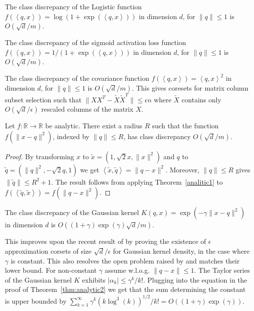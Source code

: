 \documentclass[anon,12pt]{colt2019} %
\newcommand{\ip}[1]{\left \langle #1 \right \rangle}
\newcommand{\R}{\mathbb{R}}
\newcommand{\eps}{\epsilon}
\begin{document}
{\begin{corollary}\label{cdlogistic}
The class discrepancy of the Logistic function $f(\ip{q,x}) = \log(1+\exp(\ip{q,x}))$ in dimension $d$, for $\|q\| \leq 1$ is $O(\sqrt{d}/m)$.
\end{corollary}
\begin{corollary}\label{cdsigmoid}
The class discrepancy of the sigmoid activation loss function $f(\ip{q,x}) = 1/(1+\exp(\ip{q,x}))$ in dimension $d$, for $\|q\| \leq 1$ is $O(\sqrt{d}/m)$.
\end{corollary}


\begin{corollary}
The class discrepancy of the covariance function $f(\ip{q,x}) = \ip{q,x}^2$ in dimension $d$, for $\|q\| \leq 1$ is $O(\sqrt{d}/m)$. This gives coresets for matrix column subset selection such that $\|XX^T - \tilde X \tilde X^T\| \le \eps n$ where $\tilde X$ contains only $O(\sqrt{d}/\eps)$ rescaled columns of the matrix $X$.
\end{corollary}



\begin{theorem} \label{thm:analytic2}
Let $f:\R\rightarrow\R$ be analytic. There exist a radius $R$ such that the function $f(\|x-q\|^2)$, indexed by $\|q\| \leq R$, has class discrepancy $O(\sqrt{d}/m)$. 
\end{theorem}
\begin{proof}
By transforming $x$ to $\tilde{x} = (1, \sqrt{2}x, \|x\|^2)$ and $q$ to $\tilde{q} = (\|q\|^2, -\sqrt{2}q, 1)$ we get $\ip{\tilde{x},\tilde{q}} = \|q-x\|^2$. Moreover, $\|q\| \le R$ gives $\|\tilde q\| \le R^2+1$. The result follows from applying Theorem~\ref{analitic1} to $f(\ip{ \tilde q, \tilde x}) = f(\|q-x\|^2)$.
\end{proof}

\begin{corollary}
The class discrepancy of the Gaussian kernel $K(q,x) = \exp(-\gamma \|x-q\|^2)$ in dimension $d$ is $O((1+\gamma)\exp(\gamma)\sqrt{d}/m)$.
\end{corollary} 
This improves upon the recent result of \cite{DBLP:journals/corr/abs-1802-01751} by proving the existence of $\eps$ approximation corsets of size $\sqrt{d}/\eps$ for Gaussian kernel density, in the case where $\gamma$ is constant. 
This also resolves the open problem raised by \cite{DBLP:journals/corr/abs-1802-01751} and matches their lower bound.   
For non-constant $\gamma$ assume w.l.o.g. $\|q-x\| \le 1$. The Taylor series of the Gaussian kernel $K$ exhibits $|\alpha_k| \le \gamma^k/k!$.
Plugging into the equation in the proof of Theorem~\ref{thm:analytic2} we get that the sum determining the constant is upper bounded by
$\sum_{k=1}^\infty \gamma^{k}(k\log^3(k))^{1/2}/k! = O\left((1+\gamma) \exp(\gamma)\right)$.

}
\end{document}
